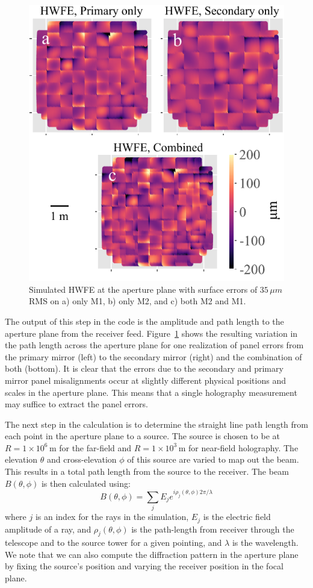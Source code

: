 \begin{figure}[t]
    \centering
    \includegraphics[width = .7\textwidth]{Figures//example_pathl_single_column2-compressed.pdf}
    \caption{Simulated HWFE at the aperture plane with surface errors of $35\,\mu m$ RMS on a) only M1, b) only M2, and c) both M2 and M1.}
    \label{fig:pan_mod}
\end{figure}

The output of this step in the code is the amplitude and path length to the aperture plane from the receiver feed.  Figure~\ref{fig:pan_mod} shows the resulting variation in the path length across the aperture plane for one realization of panel errors from the primary mirror (left) to the secondary mirror (right) and the combination of both (bottom).  It is clear that the errors due to the secondary and primary mirror panel misalignments occur at slightly different physical positions and scales in the aperture plane.  This means that a single holography measurement may suffice to extract the panel errors. 

The next step in the calculation is to determine the straight line path length from each point in the aperture plane to a source.  The source is chosen to be at $R=1\times 10^6$\,m for the far-field and $R=1\times 10^3$\,m for near-field holography.  The elevation $\theta$ and cross-elevation $\phi$ of this source are varied to map out the beam.  This results in a total path length from the source to the receiver.  The beam $B(\theta,\phi)$ is then calculated using:
\begin{equation}
    B(\theta,\phi) = \sum_j E_j e^{i \rho_j(\theta,\phi) 2\pi/\lambda} 
\end{equation}
where $j$ is an index for the rays in the simulation, $E_j$ is the electric field amplitude of a ray, and $\rho_j(\theta,\phi)$ is the path-length from receiver through the telescope and to the source tower for a given pointing, and $\lambda$ is the wavelength.  We note that we can also compute the diffraction pattern in the aperture plane by fixing the source's position and varying the receiver position in the focal plane.  

